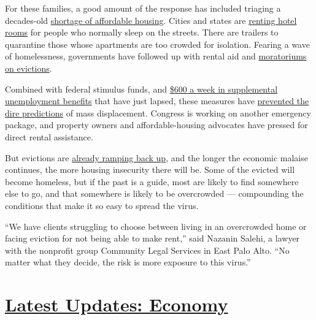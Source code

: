 For these families, a good amount of the response has included triaging
a decades-old
\href{https://reports.nlihc.org/gap\#:~:text=The\%20U.S.\%20has\%20a\%20shortage,extremely\%20low\%2Dincome\%20renter\%20households.}{shortage
of affordable housing}. Cities and states are
\href{https://www.kqed.org/news/11825653/california-found-hotels-for-10000-homeless-residents-what-next}{renting
hotel rooms} for people who normally sleep on the streets. There are
trailers to quarantine those whose apartments are too crowded for
isolation. Fearing a wave of homelessness, governments have followed up
with rental aid and
\href{https://evictionlab.org/covid-policy-scorecard/}{moratoriums on
evictions}.

Combined with federal stimulus funds, and
\href{https://www.nytimes3xbfgragh.onion/2020/07/29/business/economy/unemployment-benefits-coronavirus.html}{\$600
a week in supplemental unemployment benefits} that have just lapsed,
these measures have
\href{https://www.nytimes3xbfgragh.onion/2020/05/31/business/economy/coronavirus-rent-landlords-tenants.html}{prevented
the dire predictions} of mass displacement. Congress is working on
another emergency package, and property owners and affordable-housing
advocates have pressed for direct rental assistance.

But evictions are
\href{https://www.nytimes3xbfgragh.onion/2020/07/23/business/evictions-moratorium-cares-act.html}{already
ramping back up}, and the longer the economic malaise continues, the
more housing insecurity there will be. Some of the evicted will become
homeless, but if the past is a guide, most are likely to find somewhere
else to go, and that somewhere is likely to be overcrowded ---
compounding the conditions that make it so easy to spread the virus.

``We have clients struggling to choose between living in an overcrowded
home or facing eviction for not being able to make rent,'' said Nazanin
Salehi, a lawyer with the nonprofit group Community Legal Services in
East Palo Alto. ``No matter what they decide, the risk is more exposure
to this virus.''

\hypertarget{latest-updates-economy}{%
\section{\texorpdfstring{\href{https://www.nytimes3xbfgragh.onion/live/2020/07/31/business/stock-market-today-coronavirus?action=click\&pgtype=Article\&state=default\&region=MAIN_CONTENT_1\&context=storylines_live_updates}{Latest
Updates:
Economy}}{Latest Updates: Economy}}\label{latest-updates-economy}}

